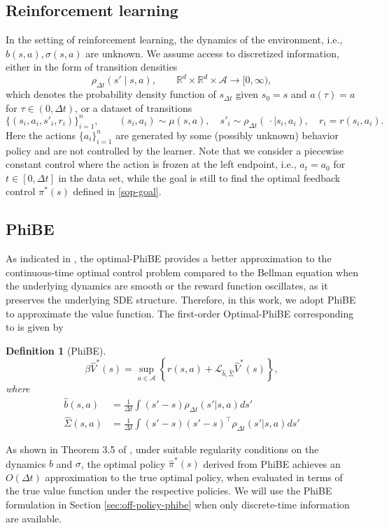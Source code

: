 \documentclass[12pt]{article}
\newtheorem{definition}{Definition}
\def\dt{{\Delta t}}
\begin{document}
\subsection{Reinforcement learning}
In the setting of reinforcement learning, the dynamics of the environment, i.e., $b(s,a), \sigma(s,a)$ are unknown.
We assume access to discretized information, either in the form of transition densities
\[
    \rho_{\Delta t}(s' \mid s,a), \qquad \mathbb{R}^d \times \mathbb{R}^d \times \mathcal{A} \to [0,\infty),
\]
which denotes the probability density function of $s_{\Delta t}$ given $s_0 = s$ and $a(\tau) = a$ for $\tau \in (0,\Delta t)$, or a dataset of transitions
\begin{equation}\label{data}
\{(s_i, a_i, s'_i, r_i)\}_{i=1}^n, \qquad (s_i, a_i)\sim \mu(s,a), \quad s'_i \sim \rho_{\Delta t}(\,\cdot \mid s_i,a_i), \quad r_i = r(s_i, a_i).    
\end{equation}
Here the actions $\{a_i\}_{i=1}^n$ are generated by some (possibly unknown) behavior policy and are not controlled by the learner. Note that we consider a piecewise constant control where the action is frozen at the left endpoint, i.e., $a_t = a_0$ for $t \in [0,\Delta t]$ in the data set, while the goal is still to find the optimal feedback control $\pi^*(s)$ defined in \eqref{sop-goal}. 


\subsection{PhiBE}\label{sec:2.2}
As indicated in \citep{zhu2024phibe,zhu2025optimal}, the optimal-PhiBE provides a better approximation to the continuous-time optimal control problem compared to the Bellman equation when the underlying dynamics are smooth or the reward function oscillates, as it preserves the underlying SDE structure. Therefore, in this work, we adopt PhiBE to approximate the value function. The first-order Optimal-PhiBE corresponding to \citep{zhu2025optimal} is given by 
\begin{definition}[PhiBE]
\begin{equation}\label{optimal-phibe}
  \beta \hat{V}^*(s)
=
\sup_{a \in \mathcal{A}}
\left\{
    r(s,a)+
     \mathcal{L}_{\hat{b}, \hat{\Sigma}} \hat{V}^*(s)
\right\},  
\end{equation}
where
\begin{equation}\label{phibe-bsigma}
\begin{aligned}
\hat{b}(s,a)&=
\frac{1}{\Delta t}
\int (s' - s)\rho_\dt(s'|s,a)ds'\\
\hat{\Sigma}(s,a)
&=
\frac{1}{\Delta t}
\int(s'- s)(s' - s)^\top \rho_\dt(s'|s,a)ds'
\end{aligned}    
\end{equation}
\end{definition}
As shown in Theorem 3.5 of \citep{zhu2025optimal}, under suitable regularity conditions on the dynamics $b$ and $\sigma$, the optimal policy $\hat{\pi}^*(s)$ derived from PhiBE achieves an $O(\dt)$ approximation to the true optimal policy, when evaluated in terms of the true value function under the respective policies. We will use the PhiBE formulation in Section \ref{sec:off-policy-phibe} when only discrete-time information are available.
\end{document}
